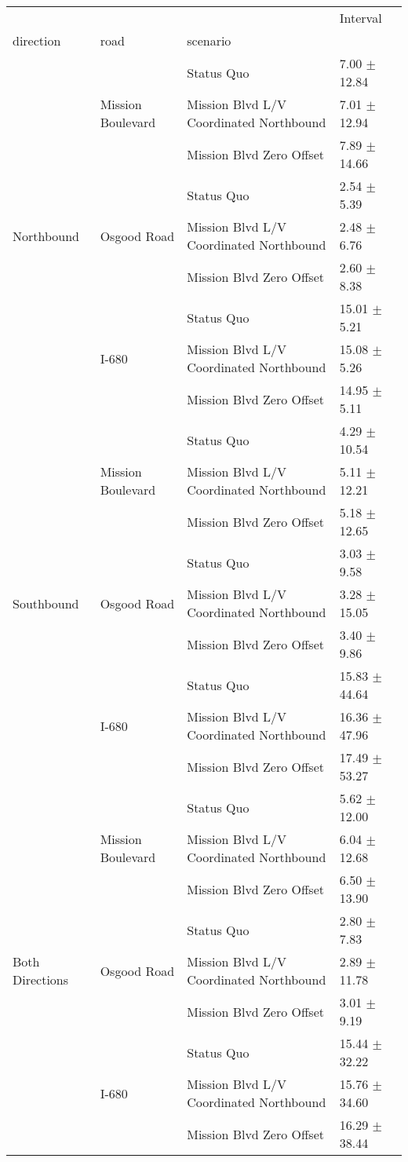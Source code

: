 \begin{tabular}{llll}
\toprule
 &  &  & Interval \\
direction & road & scenario &  \\
\midrule
\multirow[t]{9}{*}{Northbound} & \multirow[t]{3}{*}{Mission Boulevard} & Status Quo & 7.00 $\pm$ 12.84 \\
 &  & Mission Blvd L/V Coordinated Northbound & 7.01 $\pm$ 12.94 \\
 &  & Mission Blvd Zero Offset & 7.89 $\pm$ 14.66 \\
 & \multirow[t]{3}{*}{Osgood Road} & Status Quo & 2.54 $\pm$ 5.39 \\
 &  & Mission Blvd L/V Coordinated Northbound & 2.48 $\pm$ 6.76 \\
 &  & Mission Blvd Zero Offset & 2.60 $\pm$ 8.38 \\
 & \multirow[t]{3}{*}{I-680} & Status Quo & 15.01 $\pm$ 5.21 \\
 &  & Mission Blvd L/V Coordinated Northbound & 15.08 $\pm$ 5.26 \\
 &  & Mission Blvd Zero Offset & 14.95 $\pm$ 5.11 \\
\multirow[t]{9}{*}{Southbound} & \multirow[t]{3}{*}{Mission Boulevard} & Status Quo & 4.29 $\pm$ 10.54 \\
 &  & Mission Blvd L/V Coordinated Northbound & 5.11 $\pm$ 12.21 \\
 &  & Mission Blvd Zero Offset & 5.18 $\pm$ 12.65 \\
 & \multirow[t]{3}{*}{Osgood Road} & Status Quo & 3.03 $\pm$ 9.58 \\
 &  & Mission Blvd L/V Coordinated Northbound & 3.28 $\pm$ 15.05 \\
 &  & Mission Blvd Zero Offset & 3.40 $\pm$ 9.86 \\
 & \multirow[t]{3}{*}{I-680} & Status Quo & 15.83 $\pm$ 44.64 \\
 &  & Mission Blvd L/V Coordinated Northbound & 16.36 $\pm$ 47.96 \\
 &  & Mission Blvd Zero Offset & 17.49 $\pm$ 53.27 \\
\multirow[t]{9}{*}{Both Directions} & \multirow[t]{3}{*}{Mission Boulevard} & Status Quo & 5.62 $\pm$ 12.00 \\
 &  & Mission Blvd L/V Coordinated Northbound & 6.04 $\pm$ 12.68 \\
 &  & Mission Blvd Zero Offset & 6.50 $\pm$ 13.90 \\
 & \multirow[t]{3}{*}{Osgood Road} & Status Quo & 2.80 $\pm$ 7.83 \\
 &  & Mission Blvd L/V Coordinated Northbound & 2.89 $\pm$ 11.78 \\
 &  & Mission Blvd Zero Offset & 3.01 $\pm$ 9.19 \\
 & \multirow[t]{3}{*}{I-680} & Status Quo & 15.44 $\pm$ 32.22 \\
 &  & Mission Blvd L/V Coordinated Northbound & 15.76 $\pm$ 34.60 \\
 &  & Mission Blvd Zero Offset & 16.29 $\pm$ 38.44 \\
\bottomrule
\end{tabular}

